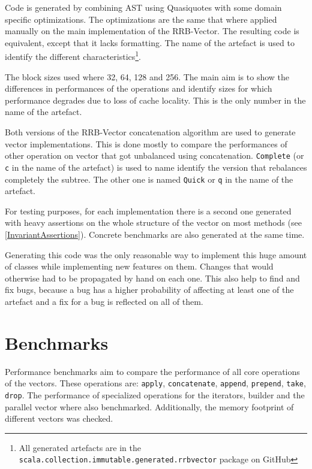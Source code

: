 Code is generated by combining AST using Quasiquotes with some domain specific optimizations. The optimizations are the same that where applied manually on the main implementation of the RRB-Vector. The resulting code is equivalent, except that it lacks formatting. The name of the artefact is used to identify the different characteristics\footnote{All generated artefacts are in the \texttt{scala.collection.immutable.generated.rrbvector} package on GitHub}.

The block sizes used where 32, 64, 128 and 256. The main aim is to show the differences in performances of the operations and identify sizes for which performance degrades due to loss of cache locality. This is the only number in the name of the artefact.

Both versions of the RRB-Vector concatenation algorithm are used to generate vector implementations. This is done mostly to compare the performances of other operation on vector that got unbalanced using concatenation. \texttt{Complete} (or \texttt{c} in the name of the artefact) is used to name identify the version that rebalances completely the subtree. The other one is named \texttt{Quick} or \texttt{q} in the name of the artefact.

For testing purposes, for each implementation there is a second one generated with heavy assertions on the whole structure of the vector on most methods (see \ref{InvariantAssertions}). 
Concrete benchmarks are also generated at the same time.

Generating this code was the only reasonable way to implement this huge amount of classes while implementing new features on them. 
Changes that would otherwise had to be propagated by hand on each one. 
This also help to find and fix bugs, because a bug has a higher probability of affecting at least one of the artefact and a fix for a bug is reflected on all of them.

\clearpage
\section{Benchmarks}
\label{Benchmarks}

Performance benchmarks aim to compare the performance of all core operations of the vectors. These operations are: \texttt{apply}, \texttt{concatenate}, \texttt{append}, \texttt{prepend}, \texttt{take}, \texttt{drop}. The performance of specialized operations for the iterators, builder and the parallel vector where also benchmarked. Additionally, the memory footprint of different vectors was checked.

